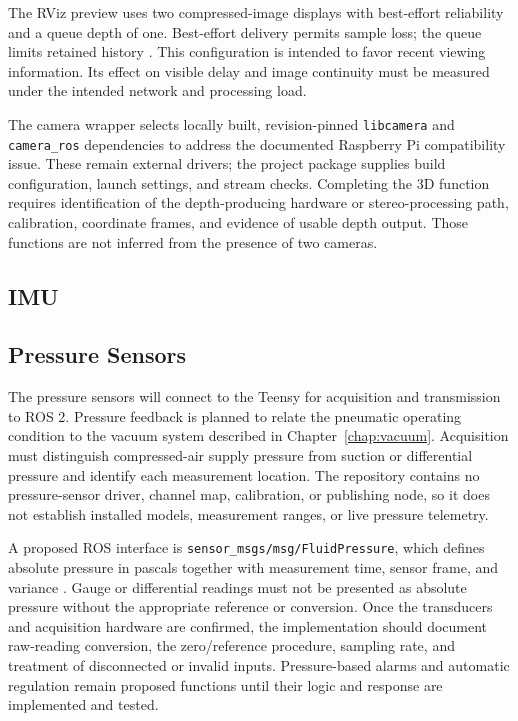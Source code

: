 The RViz preview uses two compressed-image displays with best-effort reliability and a queue depth of one. Best-effort delivery permits sample loss; the queue limits retained history \citep{ros2JazzyQoS}. This configuration is intended to favor recent viewing information. Its effect on visible delay and image continuity must be measured under the intended network and processing load.

The camera wrapper selects locally built, revision-pinned \texttt{libcamera} and \texttt{camera\_ros} dependencies to address the documented Raspberry Pi compatibility issue. These remain external drivers; the project package supplies build configuration, launch settings, and stream checks. Completing the 3D function requires identification of the depth-producing hardware or stereo-processing path, calibration, coordinate frames, and evidence of usable depth output. Those functions are not inferred from the presence of two cameras.

\subsection{IMU}
\label{sec:imu-feedback}

\subsection{Pressure Sensors}
\label{sec:pressure-feedback}
The pressure sensors will connect to the Teensy for acquisition and transmission to ROS 2. Pressure feedback is planned to relate the pneumatic operating condition to the vacuum system described in Chapter~\ref{chap:vacuum}. Acquisition must distinguish compressed-air supply pressure from suction or differential pressure and identify each measurement location. The repository contains no pressure-sensor driver, channel map, calibration, or publishing node, so it does not establish installed models, measurement ranges, or live pressure telemetry.

A proposed ROS interface is \texttt{sensor\_msgs/msg/FluidPressure}, which defines absolute pressure in pascals together with measurement time, sensor frame, and variance \citep{rosFluidPressureMessage}. Gauge or differential readings must not be presented as absolute pressure without the appropriate reference or conversion. Once the transducers and acquisition hardware are confirmed, the implementation should document raw-reading conversion, the zero/reference procedure, sampling rate, and treatment of disconnected or invalid inputs. Pressure-based alarms and automatic regulation remain proposed functions until their logic and response are implemented and tested.

